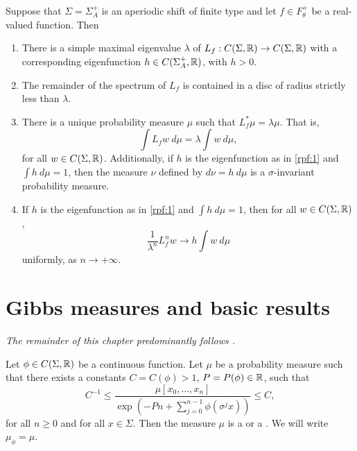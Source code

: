 \begin{theorem} \label{thm:rpf}
	Suppose that $\Sigma = \Sigma_A^+$ is an aperiodic shift of finite type and let $f \in F_\theta^+$ be a real-valued function. Then
	\begin{enumerate}
		\item There is a simple maximal eigenvalue $\lambda$ of $L_f : C(\Sigma, \mathbb{R}) \to C(\Sigma, \mathbb{R})$ with a corresponding eigenfunction $h \in C(\Sigma_A^+, \mathbb{R})$, with $h > 0$. \label{rpf:1}
		\item The remainder of the spectrum of $L_f$ is contained in a disc of radius strictly less than $\lambda$. \label{rpf:2}
		\item There is a unique probability measure $\mu$ such that $L_f^*{\mu} = \lambda\mu$. That is,
		\[
		\int{L_f{w}\ d\mu} = \lambda \int{w\ d\mu},
		\]
		for all $w \in C(\Sigma, \mathbb{R})$. Additionally, if $h$ is the eigenfunction as in \ref{rpf:1} and $\int{h\ d\mu} = 1$, then the measure $\nu$ defined by $d\nu = h\ d\mu$ is a $\sigma$-invariant probability measure. \label{rpf:3}
		\item If $h$ is the eigenfunction as in \ref{rpf:1} and $\int{h\ d\mu} = 1$, then for all $w \in C(\Sigma, \mathbb{R})$,
		\[
		\frac{1}{\lambda^n}L_f^n{w} \to h \int{w\ d\mu}
		\]
		uniformly, as $n \to +\infty$. \label{rpf:4}
	\end{enumerate}
\end{theorem}

\section{Gibbs measures and basic results}
\emph{The remainder of this chapter predominantly follows \cite[Chapter 3]{parry-pollicott:zeta-fns-periodic-orbits}.}

\begin{definition}
	Let $\phi \in C(\Sigma, \mathbb{R})$ be a continuous function. Let $\mu$ be a probability measure such that there exists a constants $C = C(\phi) > 1$, $P = P(\phi) \in \mathbb{R}$, such that
	\begin{equation}
		C^{-1} \leq \frac{\mu[x_0, \dots, x_n]}{\exp\left(-Pn + \sum_{j = 0}^{n - 1}{\phi(\sigma^j{x})} \right)} \leq C,
	\end{equation}
	for all $n \geq 0$ and for all $x \in \Sigma$. Then the measure $\mu$ is a  or a . We will write $\mu_\phi = \mu$.
\end{definition}

